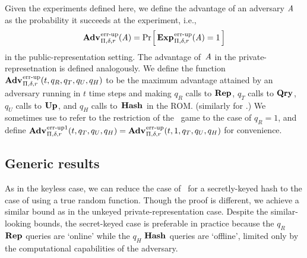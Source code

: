Given the experiments defined here, we define the advantage of an adversary
$\mathit{A}$ as the probability it succeeds at the experiment, i.e.,
\[\Adv{\errep}_{\struct,\delta,r}(\advA) = \Prob{\Exp{\errep}_{\struct,\delta,r}(\advA) = 1}\]
in the public-representation setting. The advantage of~$\mathit{A}$ in the
private-represetnation is defined analogously.
%
We define the function
$\Adv{\errep}_{\struct,\delta,r}(t,q_R,q_T,q_U,q_H)$ to be the maximum advantage
attained by an adversary running in $t$ time steps and making $q_R$ calls to
$\textup{\textbf{Rep}}\hspace{0.5pt}$, $q_T$ calls to $\textup{\textbf{Qry}}\hspace{0.5pt}$, $q_U$ calls to $\textup{\textbf{Up}}\hspace{0.5pt}$, and $q_H$ calls
to~$\textup{\textbf{Hash}}\hspace{0.5pt}$ in the ROM. (similarly for \erreps.) We sometimes use  to
refer to the restriction of the \errep\ game to the case of $q_R = 1$, and
define $\Adv{\errep1}_{\struct,\delta,r}(t,q_T,q_U,q_H) = \Adv{\errep}_{\struct,\delta,r}(t,1,q_T,q_U,q_H)$
for convenience.

\subsection{Generic results}



%
As in the keyless case, we can reduce the case of \erreps\ for a secretly-keyed
hash to the case of  using a true random function. Though the proof is
different, we achieve a similar bound as in the unkeyed private-representation
case. Despite the similar-looking bounds, the secret-keyed case is preferable in
practice because the $q_R$ $\textup{\textbf{Rep}}\hspace{0.5pt}$ queries are `online' while the $q_H$ $\textup{\textbf{Hash}}\hspace{0.5pt}$
queries are `offline', limited only by the computational capabilities of the
adversary.
%

